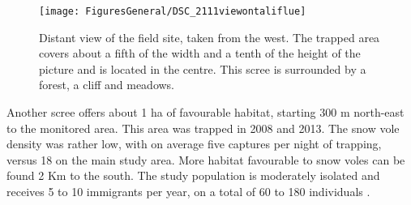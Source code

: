 \begin{figure}[ht]
	\texttt{[image: FiguresGeneral/DSC\_2111viewontaliflue]}
	\caption{Distant view of the field site, taken from the west. The trapped area covers about a fifth of the width and a tenth of the height of the picture and is located in the centre. This scree is surrounded by a forest, a cliff and meadows.}
	\label{fig:landscape}
\end{figure}
Another scree offers about 1 ha of favourable habitat, starting 300 m north-east to the monitored area. This area was trapped in 2008 and 2013. The snow vole density was rather low, with on average five captures per night of trapping, versus 18 on the main study area. More habitat favourable to snow voles can be found 2 Km to the south. The study population is moderately isolated and receives 5 to 10 immigrants per year, on a total of 60 to 180 individuals \parencite{Garcia-Navas2016}. 

